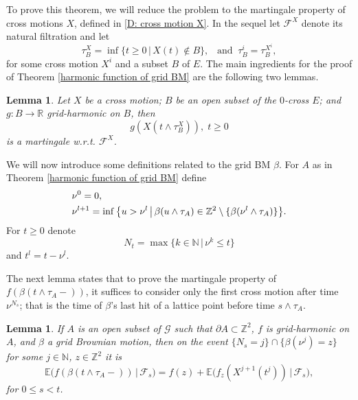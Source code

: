 \documentclass[11pt]{article}
\numberwithin{equation}{section}
\def\Ex{\mathbb{E}}
\newtheorem{lemma}[theorem]{Lemma}
\begin{document}
To prove this theorem, we will reduce the 
problem to the martingale property 
of cross motions $X$, defined in \ref{D: cross motion X}.
In the sequel let $\mathcal{F}^X$ denote its natural filtration and let
\begin{equation}\nonumber
  \tau^X_B = \inf \{t\geq 0 \,|\, X(t) \notin B \},
  \;\;\;\text{and} \;\;
  \tau^i_B = \tau^{X^i}_B,
\end{equation}
for some cross motion $X^i$ and a subset $B$ of $E$.
The main ingredients for the proof of 
Theorem \ref{harmonic function of grid BM} are the following two lemmas. 

\begin{lemma}
  \label{L: harmonic on cross}
  Let $X$ be a cross motion; $B$ be an open subset of the $0$-cross $E$;
  and $g: B \rightarrow \mathbb{R}$ grid-harmonic on $B$, then 
  \begin{equation}\nonumber
    g(X(t \land \tau^X_B)), \; t \geq 0  
  \end{equation}
  is a martingale w.r.t. $\mathcal{F}^X$. 
\end{lemma}

We will now introduce some definitions related to the grid BM $\beta$. 
For $A$ as in Theorem \ref{harmonic function of grid BM} define 
\begin{equation}\nonumber
  \begin{split}
    & \nu^0 = 0, \\ 
    & \nu^{l+1} = \inf \big{\{} u > \nu^{l} 
              \,\big|\, 
                \beta(u \land \tau_A) 
                \in \mathbb{Z}^2 \setminus 
                \{ \beta(\nu^{l} \land 
                \tau_A)\} \big{\}}.
  \end{split}
\end{equation}
For $t\geq 0$ denote
\begin{equation}\nonumber
  N_t = \max \{ k \in \mathbb{N} \,|\, 
            \nu^k \leq t\}
\end{equation}
and $t^l = t - \nu^l$.

The next lemma states that to prove the martingale property of 
\hbox{$f(\beta(t \land \tau_A-))$,} 
it suffices to consider only the 
first cross motion after time $\nu^{N_s}$;
that is the time of $\beta$'s last hit of 
a lattice point before time $s \land \tau_A$.

\begin{lemma}
  \label{L:remains to consider the first cross motion}
  If $A$ is an open subset of $\mathcal{G}$ 
  such that $\partial A \subset \mathbb{Z}^2$,
  $f$ is grid-harmonic on $A$, and $\beta$ a grid Brownian motion,
  then on the event \hbox{$\{N_s = j\} \cap \{\beta(\nu^j) = z\}$} for some 
  $j \in \mathbb{N}$, $z \in \mathbb{Z}^2$ it is 
  \begin{equation}\nonumber
    \Ex \big( f(\beta(t \land \tau_A -)) 
      \,\big|\, \mathcal{F}_s \big)
    = f(z) + \Ex\big( f_z(X^{j+1} (t^j)) 
        \,\big|\, \mathcal{F}_s \big),
  \end{equation}
  for $0 \leq s < t$.
\end{lemma}
\end{document}
